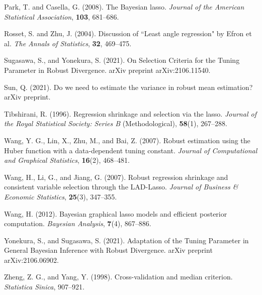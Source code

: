 \documentclass[11pt]{article}
\theoremstyle{plain}
\theoremstyle{definition}
\begin{document}
\begin{thebibliography}{99}
 Park, T. and Casella, G. (2008). The Bayesian lasso. {\it Journal of the American Statistical Association}, {\bf 103}, 681--686.

 Rosset, S. and Zhu, J. (2004). Discussion of ``Least angle regression" by Efron et al. {\it The Annals of Statistics}, {\bf 32}, 469--475.

 Sugasawa, S., and Yonekura, S. (2021). On Selection Criteria for the Tuning Parameter in Robust Divergence. arXiv preprint arXiv:2106.11540.

 Sun, Q. (2021). Do we need to estimate the variance in robust mean estimation? arXiv preprint. 

 Tibshirani, R. (1996). Regression shrinkage and selection via the lasso. {\it Journal of the Royal Statistical Society: Series B} (Methodological), {\bf 58}(1), 267--288.

 Wang, Y. G., Lin, X., Zhu, M., and Bai, Z. (2007). Robust estimation using the Huber function with a data-dependent tuning constant. {\it Journal of Computational and Graphical Statistics}, {\bf 16}(2), 468--481.

 Wang, H., Li, G., and Jiang, G. (2007). Robust regression shrinkage and consistent variable selection through the LAD-Lasso. {\it Journal of Business \& Economic Statistics}, {\bf 25}(3), 347--355.

 Wang, H. (2012). Bayesian graphical lasso models and efficient posterior computation. {\it Bayesian Analysis}, {\bf 7}(4), 867--886.

 Yonekura, S., and Sugasawa, S. (2021). Adaptation of the Tuning Parameter in General Bayesian Inference with Robust Divergence. arXiv preprint arXiv:2106.06902.

 Zheng, Z. G., and Yang, Y. (1998). Cross-validation and median criterion. {\it Statistica Sinica}, 907--921.
   
\end{thebibliography}
\end{document}
